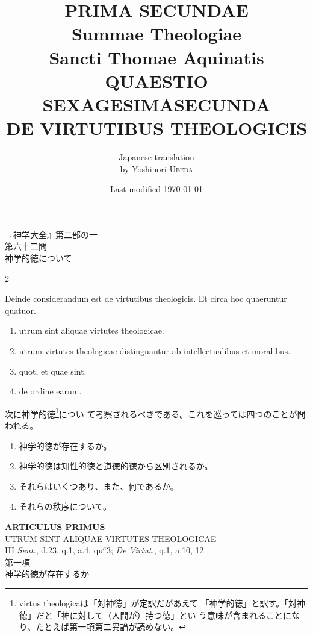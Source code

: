 \documentclass[paper=a4paper,fontsize=10pt,jafontsize=9pt,titlepage]{jlreq}
\title{{\bfseries PRIMA SECUNDAE}\\{\Huge Summae Theologiae}\\Sancti Thomae
Aquinatis\\{\sffamily QUAESTIO SEXAGESIMASECUNDA}\\DE VIRTUTIBUS THEOLOGICIS}
\author{Japanese translation\\by Yoshinori {\scshape Ueeda}}
\date{Last modified \today}
\begin{document}
\maketitle
\thispagestyle{empty}

\begin{center}
{\LARGE 『神学大全』第二部の一}\\
{\Large 第六十二問\\神学的徳について}
\end{center}

\begin{paracol}{2}

Deinde considerandum est de virtutibus theologicis. Et circa hoc quaeruntur quatuor. 

\begin{enumerate}
 \item utrum sint aliquae virtutes theologicae.
 \item utrum virtutes theologicae distinguantur ab intellectualibus et moralibus.
 \item quot, et quae sint.
 \item de ordine earum.
\end{enumerate}

\switchcolumn

次に神学的徳\footnote{virtus theologicaは「対神徳」が定訳だがあえて
 「神学的徳」と訳す。「対神徳」だと「神に対して（人間が）持つ徳」とい
 う意味が含まれることになり、たとえば第一項第二異論が読めない。}につい
 て考察されるべきである。これを巡っては四つのことが問われる。

\begin{enumerate}
 \item 神学的徳が存在するか。
 \item 神学的徳は知性的徳と道徳的徳から区別されるか。
 \item それらはいくつあり、また、何であるか。
 \item それらの秩序について。
\end{enumerate}

\end{paracol}

\newpage

{}
\setcounter{section}{1}
\setcounter{subsection}{0}
\begin{center}
{\Large {\bfseries ARTICULUS PRIMUS}}\\
{\large UTRUM SINT ALIQUAE VIRTUTES THEOLOGICAE}\\
{\footnotesize III {\itshape Sent.}, d.23, q.1, a.4; qu$^{a}$3; {\itshape De Virtut.}, q.1, a.10, 12.}\\
{\Large 第一項\\神学的徳が存在するか}
\end{center}
\end{document}
